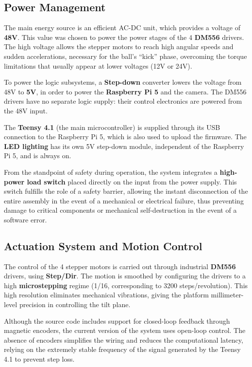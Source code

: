 \documentclass[12pt,a4paper]{report}
\begin{document}
\subsection{Power Management}
The main energy source is an efficient AC-DC unit, which provides a voltage of \textbf{48V}. This value was chosen to power the power stages of the 4 \textbf{DM556} drivers. The high voltage allows the stepper motors to reach high angular speeds and sudden accelerations, necessary for the ball's ``kick'' phase, overcoming the torque limitations that usually appear at lower voltages (12V or 24V).

To power the logic subsystems, a \textbf{Step-down} converter lowers the voltage from 48V to \textbf{5V}, in order to power the \textbf{Raspberry Pi 5} and the camera. The DM556 drivers have no separate logic supply: their control electronics are powered from the 48V input.

The \textbf{Teensy 4.1} (the main microcontroller) is supplied through its USB connection to the Raspberry Pi 5, which is also used to upload the firmware. The \textbf{LED lighting} has its own 5V step-down module, independent of the Raspberry Pi 5, and is always on.

From the standpoint of safety during operation, the system integrates a \textbf{high-power load switch} placed directly on the input from the power supply. This switch fulfills the role of a safety barrier, allowing the instant disconnection of the entire assembly in the event of a mechanical or electrical failure, thus preventing damage to critical components or mechanical self-destruction in the event of a software error.

\subsection{Actuation System and Motion Control}
The control of the 4 stepper motors is carried out through industrial \textbf{DM556} drivers, using \textbf{Step/Dir}. The motion is smoothed by configuring the drivers to a high \textbf{microstepping} regime (1/16, corresponding to 3200 steps/revolution). This high resolution eliminates mechanical vibrations, giving the platform millimeter-level precision in controlling the tilt plane.

Although the source code includes support for closed-loop feedback through magnetic encoders, the current version of the system uses open-loop control. The absence of encoders simplifies the wiring and reduces the computational latency, relying on the extremely stable frequency of the signal generated by the Teensy 4.1 to prevent step loss.
\end{document}
